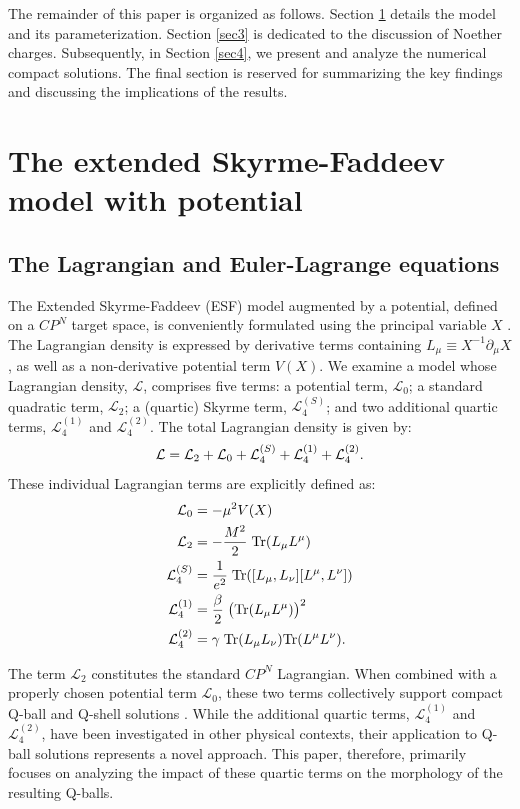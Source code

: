 \documentclass[aps,prd,superscriptaddress,notitlepage,11pt,final,longbibliography,nofootinbib]{revtex4-1}
\numberwithin{equation}{section}
\begin{document}
The remainder of this paper is organized as follows. Section \ref{sec2} details the model and its parameterization. Section \ref{sec3} is dedicated to the discussion of Noether charges. Subsequently, in Section \ref{sec4}, we present and analyze the numerical compact solutions. The final section is reserved for summarizing the key findings and discussing the implications of the results.


\section{The extended Skyrme-Faddeev model with potential}
\label{sec2}

\subsection{The Lagrangian and Euler-Lagrange equations}
The Extended Skyrme-Faddeev (ESF) model augmented by a potential, defined on a $CP^N$ target space, is conveniently formulated using the principal variable $X$ \cite{Ferreira:1998zx}. The Lagrangian density is expressed by derivative terms containing $L_{\mu}\equiv X^{-1}\partial_{\mu}X$, as well as a non-derivative potential term $V(X)$. We examine a model whose Lagrangian density, $\mathcal{L}$, comprises five terms: a potential term, $\mathcal{L}_0$; a standard quadratic term, $\mathcal{L}_2$; a (quartic) Skyrme term, $\mathcal{L}_4^{(S)}$; and two additional quartic terms, $\mathcal{L}_{4}^{(1)}$ and $\mathcal{L}_{4}^{(2)}$. The total Lagrangian density is given by:
\begin{equation}
{\cal L}={\cal L}_2+{\cal L}_0+{\cal L}_4^{(S)}+{\cal L}_{4}^{(1)}+ {\cal L}_{4}^{(2)}.\label{lagr1}
\end{equation}
These individual Lagrangian terms are explicitly defined as:
\begin{align*}
{\cal L}_0&=-\mu^2V(X)\\
{\cal L}_2&=-\frac{M^2}{2}\;{\rm Tr}(L_{\mu}L^{\mu})\\
{\cal L}_4^{(S)}&=\frac{1}{e^2}\;{\rm Tr}([L_{\mu},L_\nu][L^{\mu},L^\nu])\\
{\cal L}_4^{(1)}&=\frac{\beta}{2}\;\big({\rm Tr}(L_{\mu}L^{\mu})\big)^2\\
{\cal L}_4^{(2)}&=\gamma\;{\rm Tr}(L_{\mu}L_{\nu}){\rm Tr}(L^{\mu}L^{\nu}).
\end{align*}

The term $\mathcal{L}_2$ constitutes the standard $CP^N$ Lagrangian. When combined with a properly chosen potential term $\mathcal{L}_0$, these two terms collectively support compact Q-ball and Q-shell solutions \cite{Klimas:2017eft}. While the additional quartic terms, $\mathcal{L}_4^{(1)}$ and $\mathcal{L}_4^{(2)}$, have been investigated in other physical contexts, their application to Q-ball solutions represents a novel approach. This paper, therefore, primarily focuses on analyzing the impact of these quartic terms on the morphology of the resulting Q-balls. 
\end{document}
